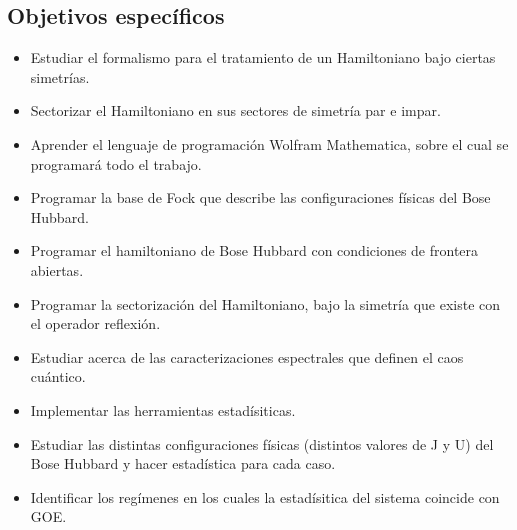 \documentclass[spanish,titlepage,table]{practicas}
\begin{document}
\subsection{Objetivos específicos}
\begin{itemize}
\item Estudiar el formalismo para el tratamiento de un Hamiltoniano bajo ciertas simetrías.
\item Sectorizar el Hamiltoniano en sus sectores de simetría par e impar.
\item Aprender el lenguaje de programación Wolfram Mathematica, sobre el cual se programará todo el trabajo.
\item Programar la base de Fock que describe las configuraciones físicas del Bose Hubbard.
\item Programar el hamiltoniano de Bose Hubbard con condiciones de frontera abiertas.
\item Programar la sectorización del Hamiltoniano, bajo la simetría que existe con el operador reflexión.
\item Estudiar acerca de las caracterizaciones espectrales que definen el caos cuántico. 
\item Implementar las herramientas estadísiticas.
\item Estudiar las distintas configuraciones físicas (distintos valores de J y U) del Bose Hubbard y hacer estadística para cada caso.
\item Identificar los regímenes en los cuales la estadísitica del sistema coincide con GOE.
\end{itemize}
\end{document}
